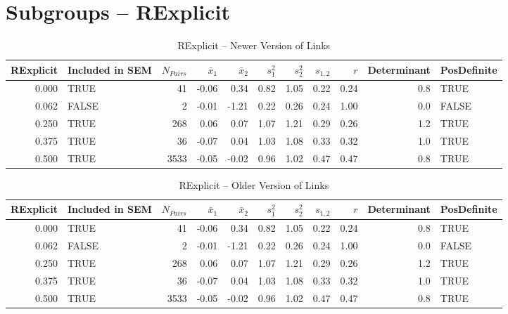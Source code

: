\documentclass{article}\usepackage[]{graphicx}\usepackage[]{color}
\begin{document}
\section{Subgroups --  RExplicit }%
\begin{table}[ht]
\centering
\begin{tabular}{rlrrrrrrrrl}
  \hline
RExplicit & Included in SEM & $N_{Pairs}$ & $\bar{x}_1$ & $\bar{x}_2$ & $s_1^2$ & $s_2^2$ & $s_{1,2}$ & $r$ & Determinant & PosDefinite \\ 
  \hline
0.000 & TRUE & 41 & -0.06 & 0.34 & 0.82 & 1.05 & 0.22 & 0.24 & 0.8 & TRUE \\ 
  0.062 & FALSE & 2 & -0.01 & -1.21 & 0.22 & 0.26 & 0.24 & 1.00 & 0.0 & FALSE \\ 
  0.250 & TRUE & 268 & 0.06 & 0.07 & 1.07 & 1.21 & 0.29 & 0.26 & 1.2 & TRUE \\ 
  0.375 & TRUE & 36 & -0.07 & 0.04 & 1.03 & 1.08 & 0.33 & 0.32 & 1.0 & TRUE \\ 
  0.500 & TRUE & 3533 & -0.05 & -0.02 & 0.96 & 1.02 & 0.47 & 0.47 & 0.8 & TRUE \\ 
   \hline
\end{tabular}
\caption{RExplicit -- Newer Version of Links} 
\end{table}
\begin{table}[ht]
\centering
\begin{tabular}{rlrrrrrrrrl}
  \hline
RExplicit & Included in SEM & $N_{Pairs}$ & $\bar{x}_1$ & $\bar{x}_2$ & $s_1^2$ & $s_2^2$ & $s_{1,2}$ & $r$ & Determinant & PosDefinite \\ 
  \hline
0.000 & TRUE & 41 & -0.06 & 0.34 & 0.82 & 1.05 & 0.22 & 0.24 & 0.8 & TRUE \\ 
  0.062 & FALSE & 2 & -0.01 & -1.21 & 0.22 & 0.26 & 0.24 & 1.00 & 0.0 & FALSE \\ 
  0.250 & TRUE & 268 & 0.06 & 0.07 & 1.07 & 1.21 & 0.29 & 0.26 & 1.2 & TRUE \\ 
  0.375 & TRUE & 36 & -0.07 & 0.04 & 1.03 & 1.08 & 0.33 & 0.32 & 1.0 & TRUE \\ 
  0.500 & TRUE & 3533 & -0.05 & -0.02 & 0.96 & 1.02 & 0.47 & 0.47 & 0.8 & TRUE \\ 
   \hline
\end{tabular}
\caption{RExplicit -- Older Version of Links} 
\end{table}
\newpage 
\end{document}
